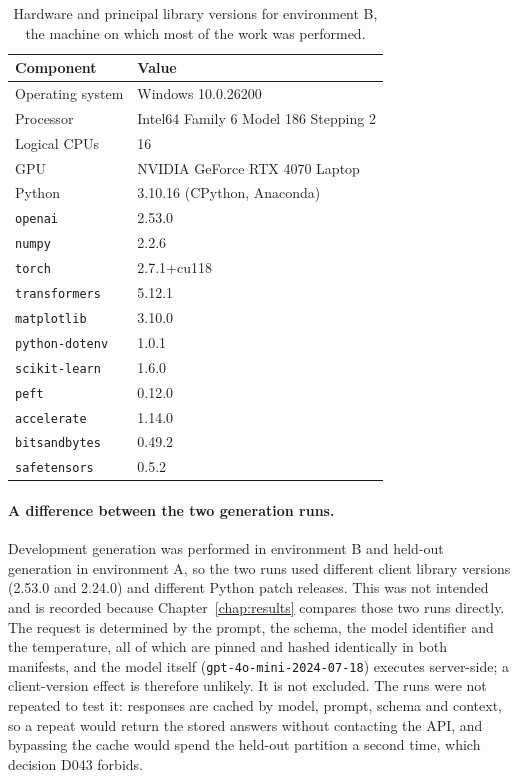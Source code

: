 \begin{table}[htbp]
  \centering
  \caption{Hardware and principal library versions for environment B, the machine on which most of the work was performed.}
  \label{tab:environment}
  \small
  \begin{tabular}{ll}
    \toprule
    \textbf{Component} & \textbf{Value} \\
    \midrule
    Operating system & Windows 10.0.26200 \\
    Processor & Intel64 Family 6 Model 186 Stepping 2 \\
    Logical CPUs & 16 \\
    GPU & NVIDIA GeForce RTX 4070 Laptop \\
    Python & 3.10.16 (CPython, Anaconda) \\
    \midrule
    \texttt{openai} & 2.53.0 \\
    \texttt{numpy} & 2.2.6 \\
    \texttt{torch} & 2.7.1+cu118 \\
    \texttt{transformers} & 5.12.1 \\
    \texttt{matplotlib} & 3.10.0 \\
    \texttt{python-dotenv} & 1.0.1 \\
    \texttt{scikit-learn} & 1.6.0 \\
    \texttt{peft} & 0.12.0 \\
    \texttt{accelerate} & 1.14.0 \\
    \texttt{bitsandbytes} & 0.49.2 \\
    \texttt{safetensors} & 0.5.2 \\
    \bottomrule
  \end{tabular}
\end{table}

\paragraph{A difference between the two generation runs.}
Development generation was performed in environment B and held-out generation in
environment A, so the two runs used different client library versions
(2.53.0 and 2.24.0) and different Python patch releases. This was not intended
and is recorded because Chapter~\ref{chap:results} compares those two runs
directly. The request is determined by the prompt, the schema, the model
identifier and the temperature, all of which are pinned and hashed identically in
both manifests, and the model itself
(\texttt{gpt-4o-mini-2024-07-18}) executes server-side; a client-version effect
is therefore unlikely. It is not excluded. The runs were not repeated to test it:
responses are cached by model, prompt, schema and context, so a repeat would
return the stored answers without contacting the API, and bypassing the cache
would spend the held-out partition a second time, which decision D043 forbids.

